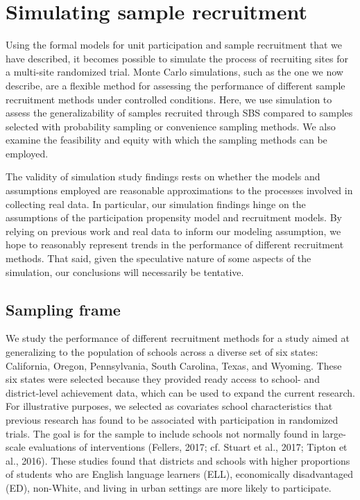 \documentclass[
  english,
  man,floatsintext]{apa6}
\begin{document}
\hypertarget{simulating-sample-recruitment}{%
\section{Simulating sample recruitment}\label{simulating-sample-recruitment}}

Using the formal models for unit participation and sample recruitment that we have described, it becomes possible to simulate the process of recruiting sites for a multi-site randomized trial.
Monte Carlo simulations, such as the one we now describe, are a flexible method for assessing the performance of different sample recruitment methods under controlled conditions.
Here, we use simulation to assess the generalizability of samples recruited through SBS compared to samples selected with probability sampling or convenience sampling methods. We also examine the feasibility and equity with which the sampling methods can be employed.

The validity of simulation study findings rests on whether the models and assumptions employed are reasonable approximations to the processes involved in collecting real data. In particular, our simulation findings hinge on the assumptions of the participation propensity model and recruitment models. By relying on previous work and real data to inform our modeling assumption, we hope to reasonably represent trends in the performance of different recruitment methods. That said, given the speculative nature of some aspects of the simulation, our conclusions will necessarily be tentative.

\hypertarget{sampling-frame}{%
\subsection{Sampling frame}\label{sampling-frame}}

We study the performance of different recruitment methods for a study aimed at generalizing to the population of schools across a diverse set of six states: California, Oregon, Pennsylvania, South Carolina, Texas, and Wyoming. These six states were selected because they provided ready access to school- and district-level achievement data, which can be used to expand the current research.
For illustrative purposes, we selected as covariates school characteristics that previous research has found to be associated with participation in randomized trials. The goal is for the sample to include schools not normally found in large-scale evaluations of interventions (Fellers, 2017; cf. Stuart et al., 2017; Tipton et al., 2016). These studies found that districts and schools with higher proportions of students who are English language learners (ELL), economically disadvantaged (ED), non-White, and living in urban settings are more likely to participate.
\end{document}
